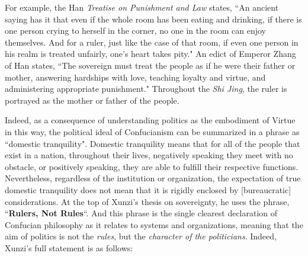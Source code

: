 For example, the Han \emph{Treatise on Punishment and Law} states, ``An ancient saying has it that even if the whole room has been eating and drinking, if there is one person crying to herself in the corner, no one in the room can enjoy themselves. And for a ruler, just like the case of that room, if even one person in his realm is treated unfairly, one's heart takes pity." An edict of Emperor Zhang of Han states, ``The sovereign must treat the people as if he were their father or mother, answering hardships with love, teaching loyalty and virtue, and administering appropriate punishment." Throughout the \emph{Shi Jing}, the ruler is portrayed as the mother or father of the people.

Indeed, as a consequence of understanding politics as the embodiment of Virtue in this way, the political ideal of Confucianism can be summarized in a phrase as ``domestic tranquility". Domestic tranquility means that for all of the people that exist in a nation, throughout their lives, negatively speaking they meet with no obstacle, or positively speaking, they are able to fulfill their respective functions. Nevertheless, regardless of the institution or organization, the expectation of true domestic tranquility does not mean that it is rigidly enclosed by [bureaucratic] considerations. At the top of Xunzi's thesis on sovereignty, he uses the phrase, ``\textbf{Rulers, Not Rules}``. And this phrase is the single clearest declaration of Confucian philosophy as it relates to systems and organizations, meaning that the aim of politics is not the \emph{rules}, but the \emph{character of the politicians}. Indeed, Xunzi's full statement is as follows:

